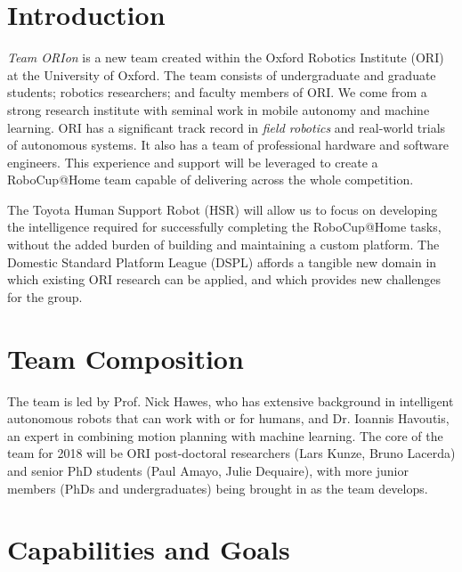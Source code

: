 \documentclass[runningheads,a4paper]{llncs}
\newcommand{\teamori}{Team ORIon}
\begin{document}

\section{Introduction}
\textit{\teamori{}} is a new team created within the Oxford Robotics Institute
(ORI) at the University of Oxford. The team consists of undergraduate and
graduate students; robotics researchers; and faculty members of ORI. We come
from a strong research institute with seminal work in mobile autonomy and
machine learning. ORI has a significant track record in \emph{field robotics}
and real-world trials of autonomous systems. It also has a team of professional
hardware and software engineers. This experience and support will be leveraged
to create a RoboCup@Home team capable of delivering across the whole
competition. 

The Toyota Human Support Robot (HSR) will allow us to focus on developing the
intelligence required for successfully completing the RoboCup@Home tasks, 
without the added burden of building and maintaining a custom platform.
The Domestic Standard Platform League (DSPL) affords a tangible new domain in
which existing ORI research can be applied, and which provides new challenges
for the group. 

\section{Team Composition}

The team is led by Prof. Nick Hawes, who has extensive background in
intelligent autonomous robots that can work with or for humans, and Dr. Ioannis Havoutis, an expert in combining motion planning with machine learning. The core of the team for 2018 will be ORI post-doctoral researchers (Lars Kunze, Bruno Lacerda) and senior PhD students (Paul Amayo, Julie Dequaire), with more junior members (PhDs and undergraduates) being brought in as the team develops. 

\section{Capabilities and Goals}
\end{document}
